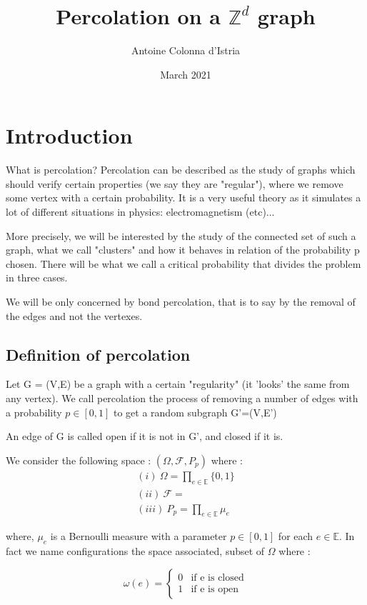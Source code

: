\documentclass{article}
\title{Percolation on a $\mathbb{Z}^d$ graph}
\author{Antoine Colonna d'Istria}
\date{March 2021}
\begin{document}
\maketitle

\section{Introduction}

What is percolation? Percolation can be described as the study of graphs which should verify certain properties (we say they are "regular"), where we remove some vertex with a certain probability. It is a very useful theory as it simulates a lot of different situations in physics: electromagnetism (etc)...

More precisely, we will be interested by the study of the connected set of such a graph, what we call "clusters" and how it behaves in relation of the probability p chosen. There will be what we call a critical probability that divides the problem in three cases.

We will be only concerned by bond percolation, that is to say by the removal of the edges and not the vertexes.

\subsection{Definition of percolation}
Let G = (V,E) be a graph with a certain "regularity" (it 'looks' the same from any vertex). We call percolation the process of removing a number of edges with a probability $\textit{p}\in [0,1]$ to get a random subgraph G'=(V,E')

An edge of G is called open if it is not in G', and closed if it is. 

We consider the following space : $(\Omega, \mathscr{F}, P_p)$ where :
\begin{gather*}
(i) \ \Omega = \prod_{e \in \mathbb{E}}{\{0,1\}} \\
(ii) \ \mathscr{F}=\\
(iii) \ P_p = \prod_{e \in \mathbb{E}}{\mu_{e}}
\end{gather*}

where, $\mu_{e}$ is a Bernoulli measure with a parameter $p\in [0,1]$ for each $e\in\mathbb{E}$. In fact we name configurations the space associated, subset of $\Omega$ where :

$$
\omega(e) = \left\{
    \begin{array}{ll}
        0 & \mbox{if e is closed}\\
        1 & \mbox{if e is open}
    \end{array}
\right.
$$
\end{document}
